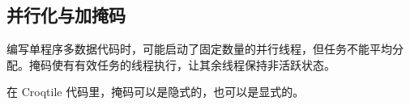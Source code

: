 \subsection*{并行化与加掩码}

编写单程序多数据代码时，可能启动了固定数量的并行线程，但任务不能平均分配。掩码使有有效任务的线程执行，让其余线程保持非活跃状态。

在 Croqtile 代码里，掩码可以是隐式的，也可以是显式的。
